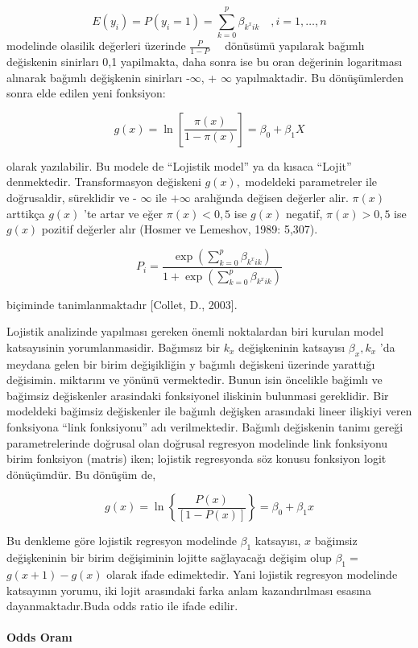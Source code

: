 \documentclass[12pt,twoside]{deuthesis}
\begin{document}
\[
E\left({y_i}\right)=P\left({y_i}=1\right)=\sum_{k=0}^{p} \beta_{k^{x} i k}\quad, {i=1, \ldots, n}
\]
modelinde olasilik değerleri üzerinde \(\frac{P}{1-P} \quad\) dönüsümü yapılarak bağımlı değiskenin sinirları 0,1 yapilmakta, daha sonra ise bu oran değerinin logaritması alınarak bağımlı değişkenin sinirları -\(\infty\), + \(\infty\) yapılmaktadir. Bu dönüşümlerden sonra elde edilen yeni fonksiyon:

\[
g(x)=\ln \left[\frac{\pi(x)}{1-\pi(x)}\right]=\beta_{0}+\beta_{1}X
\]

olarak yazılabilir. Bu modele de ``Lojistik model'' ya da kısaca ``Lojit'' denmektedir. Transformasyon değiskeni \(g(x),\) modeldeki parametreler ile doğrusaldir, süreklidir ve - \(\infty\) ile \(+\infty\) aralığında değisen değerler alir. \(\pi(x)\) arttikça \(g(x)\) 'te artar ve eğer \(\pi(x)<0,5\) ise \(g(x)\) negatif, \(\pi(x)>0,5\) ise \(g(x)\) pozitif değerler alır (Hosmer ve Lemeshov, 1989: 5,307).

\[
{P_i}=\frac{\exp \left(\sum_{k=0}^{p} \beta_{k^{x} i k}\right)}{1+\exp \left(\sum_{k=0}^{p} \beta_{k^{x} i k}\right)}
\]

biçiminde tanimlanmaktadır {[}Collet, D., 2003{]}.

Lojistik analizinde yapılması gereken önemli noktalardan biri kurulan model katsayısinin yorumlanmasidir. Bağımsız bir \({k_x}\) değişkeninin katsayısı \(\beta_{x}, {k_x}\) 'da meydana gelen bir birim değişikliğin y bağımlı değiskeni üzerinde yarattığı değisimin. miktarını ve yönünü vermektedir. Bunun isin öncelikle bağimlı ve bağimsiz değiskenler arasindaki fonksiyonel iliskinin bulunmasi gereklidir. Bir modeldeki bağimsiz değiskenler ile bağımlı değişken arasındaki lineer ilişkiyi veren fonksiyona ``link fonksiyonu'' adı verilmektedir. Bağımlı değiskenin tanimı gereği parametrelerinde doğrusal olan doğrusal regresyon modelinde link fonksiyonu birim fonksiyon (matris) iken; lojistik regresyonda söz konusu fonksiyon logit dönüçümdür. Bu dönüşüm de,

\[
{g(x)}=\ln \left\{\frac{P(x)}{[1-P(x)]}\right\}=\beta_{0}+\beta_{1} {x}
\]

Bu denkleme göre lojistik regresyon modelinde \(\beta_{1}\) katsayısı, \({x}\) bağimsiz değişkeninin bir birim değişiminin lojitte sağlayacağı değişim olup \(\beta_{1}=\) \({g(x+1)-g(x)}\) olarak ifade edimektedir. Yani lojistik regresyon modelinde katsayının yorumu, iki lojit arasındaki farka anlam kazandırılması esasına dayanmaktadır.Buda odds ratio ile ifade edilir.

\hypertarget{odds-oranux131}{%
\paragraph{Odds Oranı}\label{odds-oranux131}}
\end{document}

